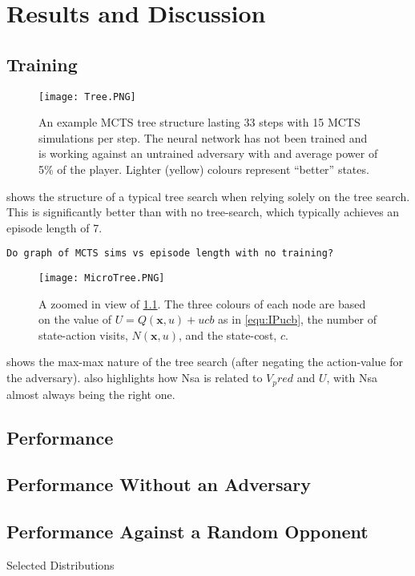 \documentclass[../main.tex]{subfiles}
\begin{document}
\onlyinsubfile{\tableofcontents{}}
\chapter{Results and Discussion}

\section{Training}

\begin{figure}[h]
    \centering
    \texttt{[image: Tree.PNG]}
    \caption{An example MCTS tree structure lasting 33 steps with 15 MCTS simulations per step. The neural network has not been trained and is working against an untrained adversary with and average power of 5\% of the player. Lighter (yellow) colours represent ``better'' states.}
    \label{fig:tree}
\end{figure}

 shows the structure of a typical tree search when relying solely on the tree search. This is significantly better than with no tree-search, which typically achieves an episode length of 7.

\texttt{Do graph of MCTS sims vs episode length with no training?}

\begin{figure}[h]
    \centering
    \texttt{[image: MicroTree.PNG]}
    \caption{A zoomed in view of \cref{fig:tree}. The three colours of each node are based on the value of $U=Q(\boldsymbol{x}, u) + ucb$ as in \cref{equ:IPucb}, the number of state-action visits, $N(\boldsymbol{x}, u)$, and the state-cost, $c$.}
    \label{fig:microtree}
\end{figure}

 shows the max-max nature of the tree search (after negating the action-value for the adversary). also highlights how Nsa is related to $V_pred$ and $U$, with Nsa almost always being the right one.


\section{Performance}

\section{Performance Without an Adversary}


\section{Performance Against a Random Opponent}
Selected Distributions
\end{document}
